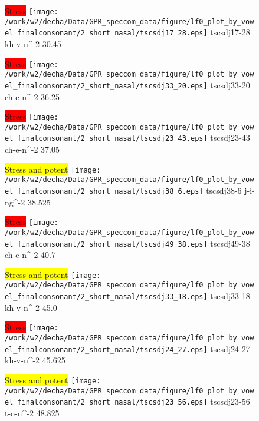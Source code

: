\documentclass{article}
\begin{document}
\begin{figure}[t]
\begin{minipage}[b]{.24\textwidth}
\colorbox{red}{Stress}
\centering
\texttt{[image: /work/w2/decha/Data/GPR\_speccom\_data/figure/lf0\_plot\_by\_vowel\_finalconsonant/2\_short\_nasal/tscsdj17\_28.eps]}
tscsdj17-28 kh-v-n\textasciicircum-2 30.45
\end{minipage}
\begin{minipage}[b]{.24\textwidth}
\colorbox{red}{Stress}
\centering
\texttt{[image: /work/w2/decha/Data/GPR\_speccom\_data/figure/lf0\_plot\_by\_vowel\_finalconsonant/2\_short\_nasal/tscsdj33\_20.eps]}
tscsdj33-20 ch-e-n\textasciicircum-2 36.25
\end{minipage}
\begin{minipage}[b]{.24\textwidth}
\colorbox{red}{Stress}
\centering
\texttt{[image: /work/w2/decha/Data/GPR\_speccom\_data/figure/lf0\_plot\_by\_vowel\_finalconsonant/2\_short\_nasal/tscsdj23\_43.eps]}
tscsdj23-43 ch-e-n\textasciicircum-2 37.05
\end{minipage}
\begin{minipage}[b]{.24\textwidth}
\colorbox{yellow}{Stress and potent}
\centering
\texttt{[image: /work/w2/decha/Data/GPR\_speccom\_data/figure/lf0\_plot\_by\_vowel\_finalconsonant/2\_short\_nasal/tscsdj38\_6.eps]}
tscsdj38-6 j-i-ng\textasciicircum-2 38.525
\end{minipage}
\end{figure}
\clearpage
\begin{figure}[t]
\begin{minipage}[b]{.24\textwidth}
\colorbox{red}{Stress}
\centering
\texttt{[image: /work/w2/decha/Data/GPR\_speccom\_data/figure/lf0\_plot\_by\_vowel\_finalconsonant/2\_short\_nasal/tscsdj49\_38.eps]}
tscsdj49-38 ch-e-n\textasciicircum-2 40.7
\end{minipage}
\begin{minipage}[b]{.24\textwidth}
\colorbox{yellow}{Stress and potent}
\centering
\texttt{[image: /work/w2/decha/Data/GPR\_speccom\_data/figure/lf0\_plot\_by\_vowel\_finalconsonant/2\_short\_nasal/tscsdj33\_18.eps]}
tscsdj33-18 kh-v-n\textasciicircum-2 45.0
\end{minipage}
\begin{minipage}[b]{.24\textwidth}
\colorbox{red}{Stress}
\centering
\texttt{[image: /work/w2/decha/Data/GPR\_speccom\_data/figure/lf0\_plot\_by\_vowel\_finalconsonant/2\_short\_nasal/tscsdj24\_27.eps]}
tscsdj24-27 kh-v-n\textasciicircum-2 45.625
\end{minipage}
\begin{minipage}[b]{.24\textwidth}
\colorbox{yellow}{Stress and potent}
\centering
\texttt{[image: /work/w2/decha/Data/GPR\_speccom\_data/figure/lf0\_plot\_by\_vowel\_finalconsonant/2\_short\_nasal/tscsdj23\_56.eps]}
tscsdj23-56 t-o-n\textasciicircum-2 48.825
\end{minipage}
\end{figure}

\begin{figure}[t]
\end{figure}
\end{document}
